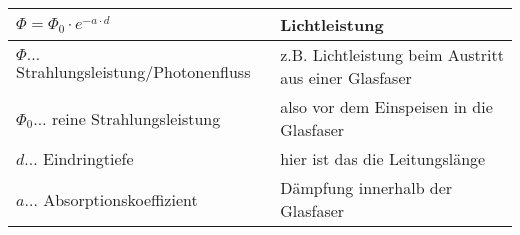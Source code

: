 \begin{table}[here]
\begin{tabular}{ll}
\toprule
  $\Phi=\Phi_0\cdot e^{-a\cdot d}$&	Lichtleistung\\
\toprule
  $\Phi \ldots$ Strahlungsleistung/Photonenfluss & z.B. Lichtleistung beim Austritt aus einer Glasfaser \\
  $\Phi_0 \ldots$ reine Strahlungsleistung & also vor dem Einspeisen in die Glasfaser\\
  $d \ldots$ Eindringtiefe& hier ist das die Leitungslänge \\
  $a \ldots$ Absorptionskoeffizient & Dämpfung innerhalb der Glasfaser\\
\midrule
\end{tabular}
\end{table}
